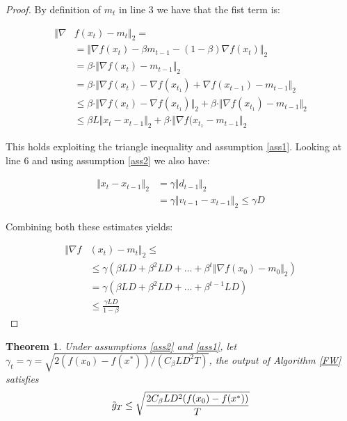 \documentclass[10pt,twocolumn,letterpaper, english]{article}
\theoremstyle{definition}
\theoremstyle{plain}
\newtheorem{theo}{Theorem}[subsection]
\theoremstyle{plain}
\theoremstyle{plain}
\theoremstyle{plain}
\theoremstyle{remark}
\theoremstyle{remark}
\theoremstyle{definition}
\theoremstyle{definition}
\theoremstyle{definition}
\theoremstyle{definition}
\begin{document}
\begin{proof}
By definition of $m_t$ in line 3 we have that the fist term is:

\begin{align*}
    \Vert \nabla & f(x_t) - m_t \Vert_2 = \\
    &= \Vert \nabla f(x_t) - \beta m_{t-1} - (1- \beta) \nabla f(x_t) \Vert_2\\
    &= \beta \cdot \Vert \nabla f(x_t) - m_{t-1} \Vert_{2}\\
    &= \beta \cdot \Vert \nabla f(x_t) - \nabla f(x_{t_1}) + \nabla f(x_{t-1}) - m_{t-1} \Vert_{2}\\
    &\le \beta \cdot \Vert \nabla f(x_t) - \nabla f(x_{t_1}) \Vert_{2} + \beta \cdot \Vert \nabla f(x_{t_1}) - m_{t-1} \Vert_{2} \\
    &\le \beta L \Vert x_t - x_{t-1} \Vert_{2} + \beta \cdot \Vert \nabla f(x_{t_1} - m_{t-1} \Vert_{2}
\end{align*}

     
    
    

This holds exploiting the triangle inequality and assumption \ref{ass1}. Looking at line 6 and using assumption \ref{ass2} we also have:

\begin{align*}
    \Vert x_t - x_{t-1} \Vert_{2} & = \gamma \Vert d_{t-1} \Vert_{2} \\
    &= \gamma \Vert v_{t-1} - x_{t-1} \Vert_{2} \le \gamma D
\end{align*}

Combining both these estimates yields:

\begin{align*}
    \Vert \nabla f & (x_t) - m_t \Vert_2 \le \\
    &\le \gamma ( \beta LD + \beta^2 LD + \dots + \beta^t \Vert \nabla f(x_0) - m_0 \Vert_2 ) \\
    & = \gamma(\beta L D + \beta^2 L D + \dots + \beta^{t-1} L D) \\
    & \le \frac{\gamma L D}{ 1 -\beta}
\end{align*}


    
\end{proof}


\begin{theo}
Under assumptions \ref{ass2} and \ref{ass1}, let $\gamma_t= \gamma= \sqrt{2(f(x_0)- f(x^\ast))/(C_\beta L D^2 T )}$, the output of Algorithm \ref{FW} satisfies
\begin{equation*}
    \Tilde{g}_T \le \sqrt{ \frac{2C_\beta L D^2 (f(x_0)- f(x^\ast))}{T}}
\end{equation*}
\end{theo}
\end{document}
